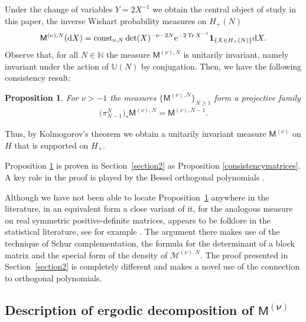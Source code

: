 \documentclass[pdftex]{sigma}
\numberwithin{equation}{section}
\newtheorem{Proposition}[Theorem]{Proposition}
{ \theoremstyle{definition}
\newtheorem{Definition}[Theorem]{Definition}
\newtheorem{Remark}[Theorem]{Remark} }
\begin{document}
Under the change of variables $Y=2X^{-1}$ we obtain the central object of study in this paper, the inverse Wishart probability measures on $H_+(N)$
\begin{align}\label{MeasureDefinition}
\mathsf{M}^{(\nu),N}({\rm d}X)= \operatorname{const}_{\nu, N} \det(X)^{-\nu-2N} {\rm e}^{-2\operatorname{Tr}X^{-1}}\mathbf{1}_{ \{X \in H_+(N) \}}{\rm d}X.
\end{align}
Observe that, for all $N \in \mathbb{N}$ the measure $\mathsf{M}^{(\nu),N}$ is unitarily invariant, namely invariant under the action of $\mathbb{U}(N)$ by conjugation. Then, we have the following consistency result:

\begin{Proposition}\label{ConsistencyIntro} For $\nu >-1$ the measures $\big\{\mathsf{M}^{(\nu),N}\big\}_{N\ge 1}$ form a projective family
\begin{gather*}
\big(\pi_{N-1}^N\big)_*\mathsf{M}^{(\nu),N}=\mathsf{M}^{(\nu),N-1}.
\end{gather*}
\end{Proposition}

Thus, by Kolmogorov's theorem we obtain a unitarily invariant measure $\mathsf{M}^{(\nu)}$ on $H$ that is supported on $H_{+}$.

Proposition \ref{ConsistencyIntro} is proven in Section~\ref{section2} as Proposition \ref{consistencymatrices}. A key role in the proof is played by the Bessel orthogonal polynomials \cite{BesselPolynomials}.

\begin{Remark}Although we have not been able to locate Proposition~\ref{ConsistencyIntro} anywhere in the lite\-ra\-ture, in an equivalent form a close variant of it, for the analogous measure on real symmetric positive-definite matrices, appears to be folklore in the statistical literature, see for example \cite[Chapter~3]{StatisticalMatrixAnalysis}. The argument there makes use of the technique of Schur complementation, the formula for the determinant of a block matrix and the special form of the density of $\mathcal{M}^{(\nu),N}$. The proof presented in Section~\ref{section2} is completely different and makes a novel use of the connection to orthogonal polynomials.
\end{Remark}

\subsection[Description of ergodic decomposition of $\mathsf{M}^{(\nu)}$]{Description of ergodic decomposition of $\boldsymbol{\mathsf{M}^{(\nu)}}$}\label{section1.4}
\end{document}
